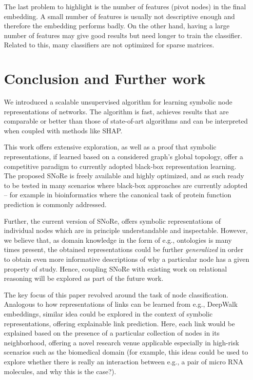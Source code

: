 \documentclass[twoside,11pt]{article}
\begin{document}
The last problem to highlight is the number of features (pivot nodes) in the final embedding. A small number of features is usually not descriptive enough and therefore the embedding performs badly. On the other hand, having a large number of features may give good results but need longer to train the classifier. Related to this, many classifiers are not optimized for sparse matrices.

\section{Conclusion and Further work}
\label{sec:conclusions}
We introduced a scalable unsupervised algorithm for learning symbolic node representations of networks. The algorithm is fast, achieves results that are comparable or better than those of state-of-art algorithms and can be interpreted when coupled with methods like SHAP.

This work offers extensive exploration, as well as a proof that symbolic representations, if learned based on a considered graph's global topology, offer a competitive paradigm to currently adopted black-box representation learning. The proposed SNoRe is freely available and highly optimized, and as such ready to be tested in many scenarios where black-box approaches are currently adopted -- for example in bioinformatics where the canonical task of protein function prediction is commonly addressed.

Further, the current version of SNoRe, offers symbolic representations of individual nodes which are in principle understandable and inspectable. However, we believe that, as domain knowledge in the form of e.g., ontologies is many times present, the obtained representations could be further \emph{generalized} in order to obtain even more informative descriptions of why a particular node has a given property of study. Hence, coupling SNoRe with existing work on relational reasoning will be explored as part of the future work.

The key focus of this paper revolved around the task of node classification. Analogous to how representations of links can be learned from e.g., DeepWalk embeddings, similar idea could be explored in the context of symbolic representations, offering explainable link prediction. Here, each link would be explained based on the presence of a particular collection of nodes in its neighborhood, offering a novel research venue applicable especially in high-risk scenarios such as the biomedical domain (for example, this ideas could be used to explore whether there is really an interaction between e.g., a pair of micro RNA molecules, and why this is the case?).
\end{document}
